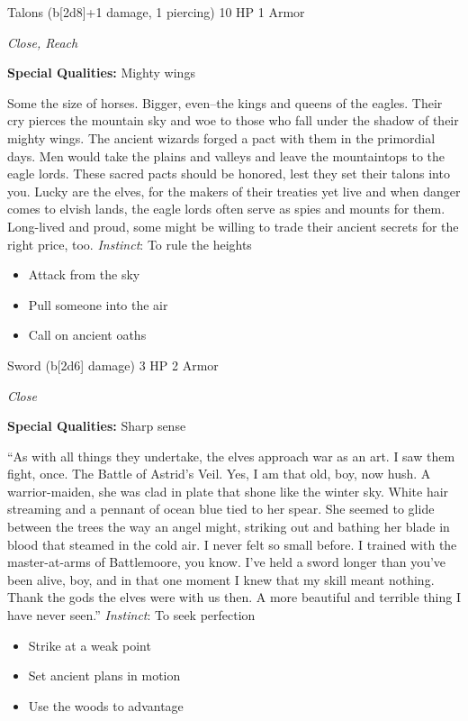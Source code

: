 Talons (b[2d8]+1 damage, 1 piercing)\hspace*{\fill} 10 HP 1 Armor

\emph{Close, Reach}

\textbf{Special Qualities:}
Mighty wings

\HRule
Some the size of horses. Bigger, even--the kings and queens of the eagles. Their cry pierces the mountain sky and woe to those who fall under the shadow of their mighty wings. The ancient wizards forged a pact with them in the primordial days. Men would take the plains and valleys and leave the mountaintops to the eagle lords. These sacred pacts should be honored, lest they set their talons into you. Lucky are the elves, for the makers of their treaties yet live and when danger comes to elvish lands, the eagle lords often serve as spies and mounts for them. Long-lived and proud, some might be willing to trade their ancient secrets for the right price, too. \emph{Instinct}: To rule the heights
\begin{itemize}
\item Attack from the sky
\item Pull someone into the air
\item Call on ancient oaths
\end{itemize}
\newpage
\HRule
{}

Sword (b[2d6] damage)\hspace*{\fill} 3 HP 2 Armor

\emph{Close}

\textbf{Special Qualities:}
Sharp sense

\HRule
``As with all things they undertake, the elves approach war as an art. I saw them fight, once. The Battle of Astrid's Veil. Yes, I am that old, boy, now hush. A warrior-maiden, she was clad in plate that shone like the winter sky. White hair streaming and a pennant of ocean blue tied to her spear. She seemed to glide between the trees the way an angel might, striking out and bathing her blade in blood that steamed in the cold air. I never felt so small before. I trained with the master-at-arms of Battlemoore, you know. I've held a sword longer than you've been alive, boy, and in that one moment I knew that my skill meant nothing. Thank the gods the elves were with us then. A more beautiful and terrible thing I have never seen.'' \emph{Instinct}: To seek perfection
\begin{itemize}
\item Strike at a weak point
\item Set ancient plans in motion
\item Use the woods to advantage
\end{itemize}
\newpage
\HRule
{}

